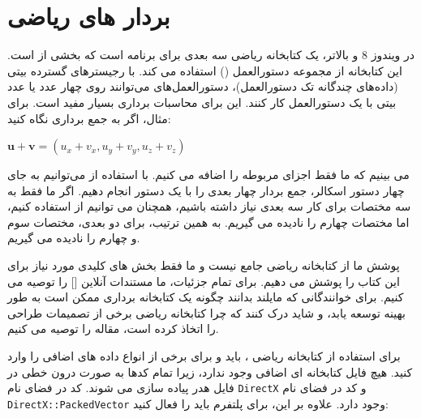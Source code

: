 \section{\textbf{بردار های ریاضی }}
{
    \Large
    \begin{spacing}{1.5}
        در ویندوز 8 و بالاتر،  یک کتابخانه ریاضی سه بعدی برای برنامه  است که بخشی از  است.
        این کتابخانه از مجموعه دستورالعمل  () استفاده می کند.
        با رجیسترهای  گسترده  بیتی (داده‌های چندگانه تک دستورالعمل)، دستورالعمل‌های  می‌توانند روی چهار عدد  یا عدد   بیتی با یک دستورالعمل کار کنند.
        این برای محاسبات برداری بسیار مفید است. برای مثال، اگر به جمع برداری نگاه کنید:

        \begin{center}
            $\textbf{u}+\textbf{v}=(u_{x}+v_{x},u_{y}+v_{y},u_{z}+v_{z})$
        \end{center}

        می بینیم که ما فقط اجزای مربوطه را اضافه می کنیم.
        با استفاده از  می‌توانیم به جای چهار دستور اسکالر، جمع بردار چهار بعدی را با یک دستور  انجام دهیم.
        اگر ما فقط به سه مختصات برای کار سه بعدی نیاز داشته باشیم، همچنان می توانیم از  استفاده کنیم، اما مختصات چهارم را نادیده می گیریم.
        به همین ترتیب، برای دو بعدی، مختصات سوم و چهارم را نادیده می گیریم.

        پوشش ما از کتابخانه ریاضی  جامع نیست و ما فقط بخش های کلیدی مورد نیاز برای این کتاب را پوشش می دهیم.
        برای تمام جزئیات، ما مستندات آنلاین [] را توصیه می کنیم.
        برای خوانندگانی که مایلند بدانند چگونه یک کتابخانه برداری  ممکن است به طور بهینه توسعه یابد، و شاید درک کنند که چرا کتابخانه ریاضی  برخی از تصمیمات طراحی را اتخاذ کرده است،
        مقاله  را توصیه می کنیم.

        برای استفاده از کتابخانه ریاضی ، باید  و برای برخی از انواع داده های اضافی  را وارد کنید.
        هیچ فایل کتابخانه ای اضافی وجود ندارد، زیرا تمام کدها به صورت درون خطی در فایل هدر پیاده سازی می شوند.
        کد  در فضای نام \texttt{DirectX} و کد  در فضای نام \texttt{DirectX::PackedVector} وجود دارد.
        علاوه بر این، برای پلتفرم  باید  را فعال کنید:


\end{spacing}}

